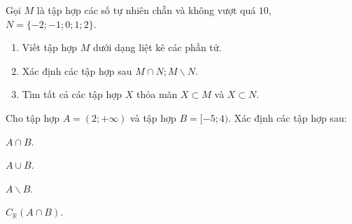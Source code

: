 

\begin{bt}%
	Gọi $M$ là tập hợp các số tự nhiên chẵn và không vượt quá $10$, $N=\{-2 ;-1 ; 0 ; 1 ; 2\}$.
	\begin{enumerate}
		\item Viết tập hợp $M$ dưới dạng liệt kê các phần tử.
		\item Xác định các tập hợp sau $M \cap N ; M \backslash N$.
		\item Tìm tất cả các tập hợp $X$ thỏa mãn $X \subset M$ và $X \subset N$.
	\end{enumerate}
\end{bt}
\begin{bt}%
	Cho tập hợp $A=(2 ;+\infty)$ và tập hợp $B=[-5 ; 4)$. Xác định các tập hợp sau:
	\begin{listEX}[4]
		\item $A \cap B$.
		\item $A \cup B$.
		\item $A \backslash B$.
		\item $C_{\mathbb{R}}(A \cap B)$.
	\end{listEX}
	\loigiai{\begin{enumerate}
			\item $A \cap B=(2;4)$.
			\item $A \cup B=[-5;+\infty)$.
			\item $A \backslash B=[4;+\infty)$.
			\item $C_{\mathbb{R}}(A \cap B)=(-\infty;2]\cup [4;+\infty)$.
	\end{enumerate}}
\end{bt}
